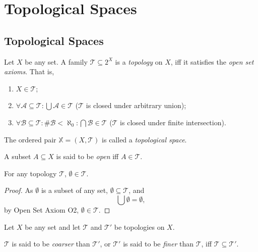 \chapter{Topological Spaces}


\section{Topological Spaces}


\begin{definition}
	\label{def: topological spaces}
	Let $X$ be any set. A family $\mathcal T \subseteq 2^X$ is a \textit{topology} on $X$, iff it satisfies the \textit{open set axioms}. That is,
	\begin{enumerate}[O1.]
		\item $X \in \mathcal T$;
		\item $\forall \mathcal A \subseteq \mathcal T: \bigcup \mathcal A \in \mathcal T$ ($\mathcal T$ is closed under arbitrary union);
		\item $\forall \mathcal B \subseteq \mathcal T: \#\mathcal B < \aleph_0: \bigcap \mathcal B \in \mathcal T$ ($\mathcal T$ is closed under finite intersection).
	\end{enumerate}
	
	The ordered pair $\mathbb X = (X, \mathcal T)$ is called a \textit{topological space}.
	
	A subset $A \subseteq X$ is said to be \textit{open} iff $A \in \mathcal T$.
\end{definition}


\begin{lemma}
	\label{lm: topological spaces: emptyset in topology}

	For any topology $\mathcal T$, $\emptyset \in \mathcal T$.
	
	\begin{proof}
		As $\emptyset$ is a subset of any set, $\emptyset \subseteq \mathcal T$, and
		$$
		\bigcup \emptyset = \emptyset,
		$$
		by Open Set Axiom O2, $\emptyset \in \mathcal T$.
	\end{proof}
\end{lemma}


\begin{definition}
	Let $X$ be any set and let $\mathcal T$ and $\mathcal T'$ be topologies on $X$.
	
	$\mathcal T$ is said to be \textit{coarser} than $\mathcal T'$, or $\mathcal T'$ is said to be \textit{finer} than $\mathcal T$, iff $\mathcal T \subseteq \mathcal T'$.
\end{definition}


